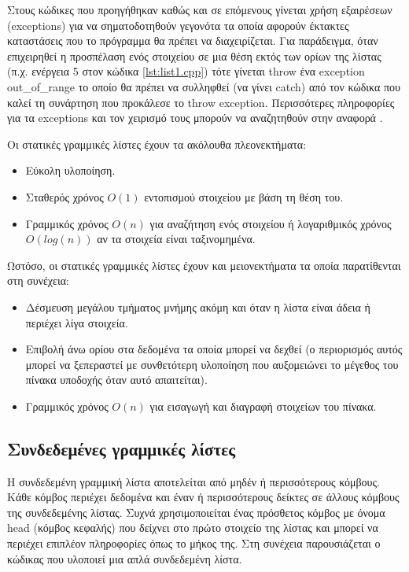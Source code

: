 Στους κώδικες που προηγήθηκαν καθώς και σε επόμενους γίνεται χρήση εξαιρέσεων (exceptions) για να σηματοδοτηθούν γεγονότα τα οποία αφορούν έκτακτες καταστάσεις που το πρόγραμμα θα πρέπει να διαχειρίζεται. Για παράδειγμα, όταν επιχειρηθεί η προσπέλαση ενός στοιχείου σε μια θέση εκτός των ορίων της λίστας (π.χ. ενέργεια 5 στον κώδικα \ref{lst:list1.cpp}) τότε γίνεται throw ένα exception out\_of\_range το οποίο θα πρέπει να συλληφθεί (να γίνει catch) από τον κώδικα που καλεί τη συνάρτηση που προκάλεσε το throw exception. Περισσότερες πληροφορίες για τα exceptions και τον χειρισμό τους μπορούν να αναζητηθούν στην αναφορά \cite{cppexceptions}.


Οι στατικές γραμμικές λίστες έχουν τα ακόλουθα πλεονεκτήματα:
\begin{itemize}[nolistsep]
\item Εύκολη υλοποίηση. 
\item Σταθερός χρόνος $O(1)$ εντοπισμού στοιχείου με βάση τη θέση του.
\item Γραμμικός χρόνος $O(n)$ για αναζήτηση ενός στοιχείου ή λογαριθμικός χρόνος $O(log(n))$ αν τα στοιχεία είναι ταξινομημένα.
\end{itemize}

Ωστόσο, οι στατικές γραμμικές λίστες έχουν και μειονεκτήματα τα οποία παρατίθενται στη συνέχεια:
\begin{itemize}[nolistsep]
\item Δέσμευση μεγάλου τμήματος μνήμης ακόμη και όταν η λίστα είναι άδεια ή περιέχει λίγα στοιχεία. 
\item Επιβολή άνω ορίου στα δεδομένα τα οποία μπορεί να δεχθεί (ο περιορισμός αυτός μπορεί να ξεπεραστεί με συνθετότερη υλοποίηση που αυξομειώνει το μέγεθος του πίνακα υποδοχής όταν αυτό απαιτείται).
\item Γραμμικός χρόνος $O(n)$ για εισαγωγή και διαγραφή στοιχείων του πίνακα.
\end{itemize}


\subsection{Συνδεδεμένες γραμμικές λίστες}
Η συνδεδεμένη γραμμική λίστα αποτελείται από μηδέν ή περισσότερους κόμβους. Κάθε κόμβος περιέχει δεδομένα και έναν ή περισσότερους δείκτες σε άλλους κόμβους της συνδεδεμένης λίστας. Συχνά χρησιμοποιείται ένας πρόσθετος κόμβος με όνομα head (κόμβος κεφαλής) που δείχνει στο πρώτο στοιχείο της λίστας και μπορεί να περιέχει επιπλέον πληροφορίες όπως το μήκος της. Στη συνέχεια παρουσιάζεται ο κώδικας που υλοποιεί μια απλά συνδεδεμένη λίστα.

